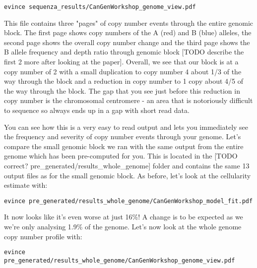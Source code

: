 \begin{steps}
\begin{lstlisting}
evince sequenza_results/CanGenWorkshop_genome_view.pdf
\end{lstlisting}
\end{steps}

This file contains three "pages" of copy number events through the entire genomic block. The first page shows copy numbers of the A (red) and B (blue) alleles, the second page shows the overall copy number change and the third page shows the B allele frequency and depth ratio through genomic block [TODO describe the first 2 more after looking at the paper]. Overall, we see that our block is at a copy number of 2 with a small duplication to copy number 4 about 1/3 of the way through the block and a reduction in copy number to 1 copy about 4/5 of the way through the block. The gap that you see just before this reduction in copy number is the chromosomal centromere - an area that is notoriously difficult to sequence so always ends up in a gap with short read data.

You can see how this is a very easy to read output and lets you immediately see the frequency and severity of copy number events through your genome. Let's compare the small genomic block we ran with the same output from the entire genome which has been pre-computed for you. This is located in the [TODO correct? pre_generated/results_whole_genome] folder and contains the same 13 output files as for the small genomic block. As before, let's look at the cellularity estimate with:

\begin{steps}
\begin{lstlisting}
evince pre_generated/results_whole_genome/CanGenWorkshop_model_fit.pdf
\end{lstlisting}
\end{steps}

It now looks like it's even worse at just 16\%! A change is to be expected as we we're only analysing 1.9\% of the genome. Let's now look at the whole genome copy number profile with:

\begin{steps}
\begin{lstlisting}
evince pre_generated/results_whole_genome/CanGenWorkshop_genome_view.pdf
\end{lstlisting}
\end{steps}

